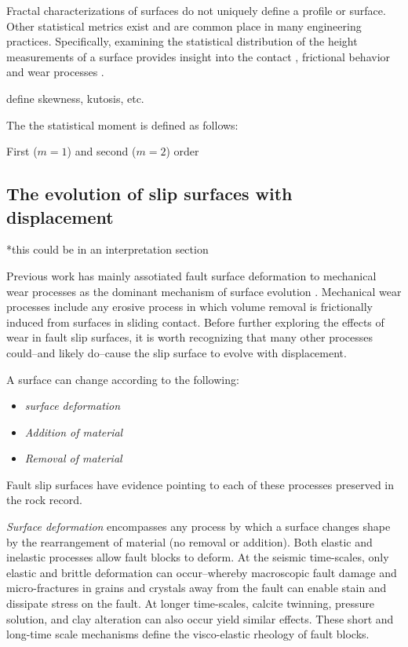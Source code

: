 \documentclass[12pt,a4paper]{article}
\begin{document}
Fractal characterizations of surfaces do not uniquely define a profile or surface. Other statistical metrics exist and are common place in many engineering practices. Specifically, examining the statistical distribution of the height measurements of a surface provides insight into the contact \cite{greenwood1966}, frictional behavior \cite{XXX} and wear processes \cite{archard1953contact}.

define skewness, kutosis, etc.

The the statistical moment is defined as follows:

First ($m=1$) and second ($m=2$) order  



\subsection{The evolution of slip surfaces with displacement}

*this could be in an interpretation section

Previous work has mainly assotiated fault surface deformation to mechanical wear processes as the dominant mechanism of surface evolution \cite{power1988roughness, sagy2007evolution, brodsky2011faults}. Mechanical wear processes include any erosive process in which volume removal is frictionally induced from surfaces in sliding contact. Before further exploring the effects of wear in fault slip surfaces, it is worth recognizing that many other processes could--and likely do--cause the slip surface to evolve with displacement.

A surface can change according to the following:

\begin{itemize}
	\item[] \textit{surface deformation}
	\item[] \textit{Addition of material}
	\item[] \textit{Removal of material}
\end{itemize}

Fault slip surfaces have evidence pointing to each of these processes preserved in the rock record.

\textit{Surface deformation} encompasses any process by which a surface changes shape by the rearrangement of material (no removal or addition). Both elastic and inelastic processes allow fault blocks to deform. At the seismic time-scales, only elastic and brittle deformation can occur--whereby macroscopic fault damage and micro-fractures in grains and crystals away from the fault can enable stain and dissipate stress on the fault. At longer time-scales, calcite twinning, pressure solution, and clay alteration can also occur yield similar effects. These short and long-time scale mechanisms define the visco-elastic rheology of fault blocks.
\end{document}
